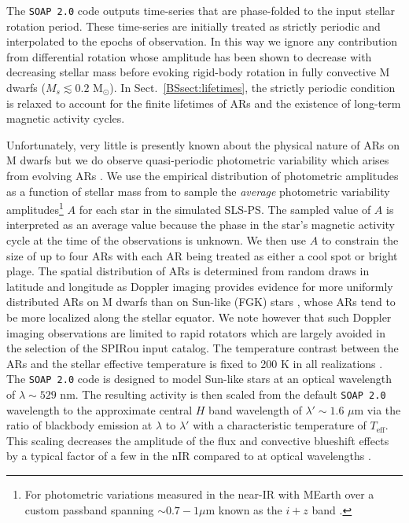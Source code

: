 The \texttt{SOAP 2.0} code outputs time-series that are phase-folded to the input 
stellar rotation period. These time-series are initially treated as strictly periodic
and interpolated to the epochs of observation. In
this way we ignore any contribution from differential rotation whose amplitude has been shown to
decrease with decreasing stellar mass \citep{donati08, morin08, kitchatinov11}
before evoking rigid-body rotation in fully convective M dwarfs
($M_s \lesssim 0.2$ M$_{\odot}$). In Sect.~\ref{BSsect:lifetimes},
the strictly periodic condition is relaxed to account for the finite lifetimes of ARs and the existence of
long-term magnetic activity cycles.

Unfortunately, very little is presently known about the physical nature of ARs on M dwarfs but we do observe
quasi-periodic photometric variability which arises from evolving ARs \citep{oneal05}. We use the
empirical distribution of photometric amplitudes as a function of stellar mass from \cite{newton16a} to sample
the \emph{average} photometric variability amplitudes\footnote{For photometric variations measured in the near-IR
  with MEarth over a custom passband spanning $\sim 0.7-1 \mu$m known as the $i+z$ band \citep{nutzman08}.}
$A$ for each star in the simulated SLS-PS. The sampled value of $A$ is interpreted as an
average value because the phase in the star's magnetic activity cycle at the time of the \cite{newton16a}
observations is unknown. We then use $A$ to constrain the size of up to four ARs with each AR being treated as either
a cool spot or bright plage. The spatial distribution of
ARs is determined from random draws in latitude and longitude as  
Doppler imaging provides evidence for more uniformly distributed ARs on M dwarfs than on
Sun-like (FGK) stars \citep{barnes01, barnes04}, whose ARs tend to be more localized along the
stellar equator. We note however that such Doppler imaging observations are limited to rapid rotators
which are largely avoided in the selection of the SPIRou input catalog. 
The temperature contrast between the ARs and the stellar effective
temperature is fixed to 200 K in all realizations \citep{berdyugina05}. The \texttt{SOAP 2.0} code is
designed to model Sun-like stars at an optical wavelength of $\lambda \sim 529$ nm.
The resulting activity is then scaled from the default \texttt{SOAP 2.0} wavelength to the approximate
central $H$ band wavelength of $\lambda' \sim 1.6$ $\mu$m via the ratio of blackbody emission at $\lambda$ to $\lambda'$
with a characteristic temperature of $T_{\text{eff}}$. 
This scaling decreases the amplitude of the flux and convective blueshift effects by a typical
factor of a few in the nIR compared to at optical wavelengths
\citep{martin06, huelamo08, prato08, reiners10, mahmud11}.


